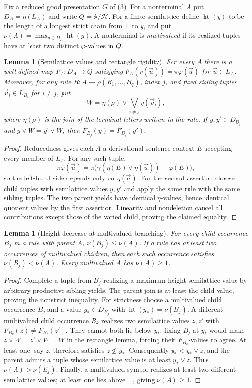 \documentclass[11pt]{article}
\numberwithin{equation}{section}
\theoremstyle{plain}
\newtheorem{lemma}[theorem]{Lemma}
\theoremstyle{definition}
\theoremstyle{remark}
\newcommand{\tuple}[1]{\vec{#1}}
\theoremstyle{plain}
\begin{document}
Fix a reduced good presentation $G$ of (3).
For a nonterminal $A$ put $D_A=\eta(L_A)$ and write
$Q=\mathbb A/\mathcal H$. For a finite semilattice define
$\operatorname{ht}(y)$ to be the length of a longest strict
chain from $\bot$ to $y$, and put
$\nu(A)=\max_{y\in D_A}\operatorname{ht}(y)$.
A nonterminal is \emph{multivalued} if its realized tuples
have at least two distinct $\varphi$-values in $Q$.

\begin{lemma}[Semilattice values and rectangle rigidity]
\label{lem:mcfg-sl-rectangle}
For every $A$ there is a well-defined map
$F_A:D_A\to Q$ satisfying
$F_A(\eta(\tuple u))=\pi\varphi(\tuple u)$ for $\tuple u\in L_A$.
Moreover, for any rule $R:A\to\rho(B_1,\ldots,B_q)$,
index $j$, and fixed sibling tuples $\tuple v_i\in L_{B_i}$
for $i\ne j$, put
\[
 W=\eta(\rho)\vee\bigvee_{i\ne j}\eta(\tuple v_i),
\]
where $\eta(\rho)$ is the join of the terminal letters written
in the rule. If $y,y'\in D_{B_j}$ and
$y\vee W=y'\vee W$, then
$F_{B_j}(y)=F_{B_j}(y')$.
\end{lemma}
\begin{proof}
Reducedness gives each $A$ a derivational sentence context $E$
accepting every member of $L_A$. For any such tuple,
\[
 \pi\varphi(\tuple u)
 =\pi\bigl(\gamma(\eta(E)\vee\eta(\tuple u))
          -\varphi(E)\bigr),
\]
so the left-hand side depends only on $\eta(\tuple u)$.
For the second assertion choose child tuples with semilattice
values $y,y'$ and apply the same rule with the same sibling
tuples. The two parent yields have identical $\eta$-values,
hence identical quotient values by the first assertion.
Linearity and nondeletion cancel all contributions except
those of the varied child, proving the claimed equality.
\end{proof}

\begin{lemma}[Height decrease at multivalued branching]
\label{lem:mcfg-sl-height}
For every child occurrence $B_j$ in a rule with parent $A$,
$\nu(B_j)\le\nu(A)$.
If a rule has at least two occurrences of multivalued
children, then each such occurrence satisfies
$\nu(B_j)<\nu(A)$.
Every multivalued $A$ has $\nu(A)\ge1$.
\end{lemma}
\begin{proof}
Complete a tuple from $B_j$ realizing a maximum-height
semilattice value by arbitrary productive sibling yields.
The parent join is at least the child value, proving the
nonstrict inequality.
For strictness choose a multivalued child occurrence $B_j$
and a value $y_*\in D_{B_j}$ with
$\operatorname{ht}(y_*)=\nu(B_j)$.
A different multivalued child occurrence $B_k$ realizes
two semilattice values $z,z'$ with $F_{B_k}(z)\ne F_{B_k}(z')$.
They cannot both lie below $y_*$: fixing $B_j$ at $y_*$
would make $z\vee W=z'\vee W=W$ in the rectangle lemma,
forcing their $F_{B_k}$-values to agree.
At least one, say $z$, therefore satisfies $z\nleq y_*$.
Consequently $y_*<y_*\vee z$, and the parent admits a tuple
whose semilattice value is at least $y_*\vee z$.
Thus $\nu(A)>\nu(B_j)$.
Finally, a multivalued symbol realizes at least two
different semilattice values; at least one lies above
$\bot$, giving $\nu(A)\ge1$.
\end{proof}
\end{document}
